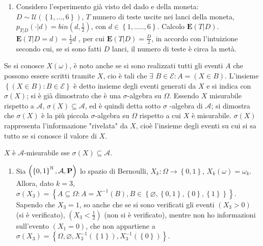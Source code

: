 \documentclass{article}
\begin{document}
\begin{enumerate}
\item Considero l'esperimento gi\`{a} visto del dado e della moneta: $D\sim 
\mathcal{U}\left( \left\{ 1,...,6\right\} \right) $, $T$ numero di teste
uscite nei lanci della moneta, $p_{T|D}\left( \cdot |d\right) =bin\left( d,%
\frac{1}{2}\right) $, con $d\in \left\{ 1,.....,6\right\} $. Calcolo $%
\mathbf{E}\left( T|D\right) $. $\mathbf{E}\left( T|D=d\right) =\frac{1}{2}d$%
, per cui $\mathbf{E}\left( T|D\right) =\frac{D}{2}$, in accordo con
l'intuizione secondo cui, se si sono fatti $D$ lanci, il numero di teste 
\`{e} circa la met\`{a}.
\end{enumerate}

Se si conosce $X\left( \omega \right) $, \`{e} noto anche se si sono
realizzati tutti gli eventi $A$ che possono essere scritti tramite $X$, cio%
\`{e} tali che $\exists $ $B\in \mathcal{E}:A=\left( X\in B\right) $.
L'insieme $\left\{ \left( X\in B\right) :B\in \mathcal{E}\right\} $ \`{e}
detto insieme degli eventi generati da $X$ e si indica con $\sigma \left(
X\right) $; si \`{e} gi\`{a} dimostrato che \`{e} una $\sigma $-algebra su $%
\Omega $. Essendo $X$ misurabile rispetto a $\mathcal{A}$, $\sigma \left(
X\right) \subseteq \mathcal{A}$, ed \`{e} quindi detta sotto $\sigma $%
-algebra di $\mathcal{A}$; si dimostra che $\sigma \left( X\right) $ \`{e}
la pi\`{u} piccola $\sigma $-algebra su $\Omega $ rispetto a cui $X$ \`{e}
misurabile. $\sigma \left( X\right) $ rappresenta l'informazione "rivelata"
da $X$, cio\`{e} l'insieme degli eventi su cui si sa tutto se si conosce il
valore di $X$.

$X$ \`{e} $\mathcal{A}$-misurabile sse $\sigma \left( X\right) \subseteq 
\mathcal{A}$.

\begin{enumerate}
\item Sia $\left( \left\{ 0,1\right\} ^{%
\mathbb{N}
},\mathcal{A},\mathbf{P}\right) $ lo spazio di Bernoulli, $%
X_{k}:\Omega \rightarrow \left\{ 0,1\right\} $, $X_{k}\left( \omega \right)
=\omega _{k}$. Allora, dato $k=3$, $\sigma \left( X_{3}\right) =\left\{
A\subseteq \Omega :A=X^{-1}\left( B\right) ,B\in \left\{ \varnothing
,\left\{ 0,1\right\} ,\left\{ 0\right\} ,\left\{ 1\right\} \right\} \right\} 
$. Sapendo che $X_{3}=1$, so anche che se si sono verificati gli eventi $%
\left( X_{3}>0\right) $ (si \`{e} verificato), $\left( X_{3}<\frac{1}{2}%
\right) $ (non si \`{e} verificato), mentre non ho informazioni sull'evento $%
\left( X_{1}=0\right) $, che non appartiene a $\sigma \left( X_{3}\right)
=\left\{ \Omega ,\varnothing ,X_{3}^{-1}\left( \left\{ 1\right\} \right)
,X_{3}^{-1}\left( \left\{ 0\right\} \right) \right\} $.
\end{enumerate}
\end{document}
